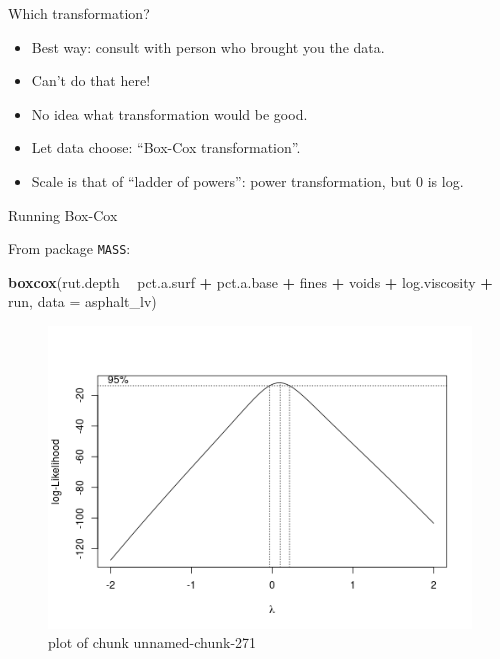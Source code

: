 \documentclass[ignorenonframetext,]{beamer}
\newenvironment{Shaded}{\begin{snugshade}}{\end{snugshade}}
\newcommand{\DataTypeTok}[1]{\textcolor[rgb]{0.13,0.29,0.53}{#1}}
\newcommand{\KeywordTok}[1]{\textcolor[rgb]{0.13,0.29,0.53}{\textbf{#1}}}
\newcommand{\NormalTok}[1]{#1}
\newcommand{\OperatorTok}[1]{\textcolor[rgb]{0.81,0.36,0.00}{\textbf{#1}}}
\newcommand{\StringTok}[1]{\textcolor[rgb]{0.31,0.60,0.02}{#1}}
\providecommand{\tightlist}{%
  \setlength{\itemsep}{0pt}\setlength{\parskip}{0pt}}
\begin{document}
\begin{frame}{Which transformation?}
\protect\hypertarget{which-transformation}{}

\begin{itemize}
\tightlist
\item
  Best way: consult with person who brought you the data.
\item
  Can't do that here!
\item
  No idea what transformation would be good.
\item
  Let data choose: ``Box-Cox transformation''.
\item
  Scale is that of ``ladder of powers'': power transformation, but 0 is
  log.
\end{itemize}

\end{frame}

\begin{frame}[fragile]{Running Box-Cox}
\protect\hypertarget{running-box-cox}{}

From package \texttt{MASS}:

\begin{Shaded}
\begin{Highlighting}[]
\KeywordTok{boxcox}\NormalTok{(rut.depth }\OperatorTok{~}\StringTok{ }\NormalTok{pct.a.surf }\OperatorTok{+}\StringTok{ }\NormalTok{pct.a.base }\OperatorTok{+}\StringTok{ }\NormalTok{fines }\OperatorTok{+}\StringTok{ }\NormalTok{voids }\OperatorTok{+}
\StringTok{  }\NormalTok{log.viscosity }\OperatorTok{+}\StringTok{ }\NormalTok{run, }\DataTypeTok{data =}\NormalTok{ asphalt_lv)}
\end{Highlighting}
\end{Shaded}

\begin{figure}
\centering
\includegraphics{figure/unnamed-chunk-271-1.png}
\caption{plot of chunk unnamed-chunk-271}
\end{figure}

\end{frame}
\end{document}
